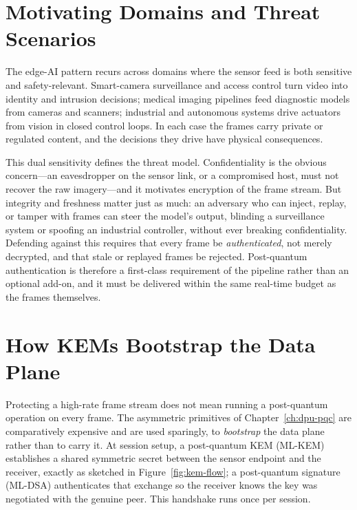 \section{Motivating Domains and Threat Scenarios}
\label{sec:edge-threats}

The edge-AI pattern recurs across domains where the sensor feed is both sensitive and safety-relevant. Smart-camera surveillance and access control turn video into identity and intrusion decisions; medical imaging pipelines feed diagnostic models from cameras and scanners; industrial and autonomous systems drive actuators from vision in closed control loops. In each case the frames carry private or regulated content, and the decisions they drive have physical consequences.

This dual sensitivity defines the threat model. Confidentiality is the obvious concern---an eavesdropper on the sensor link, or a compromised host, must not recover the raw imagery---and it motivates encryption of the frame stream. But integrity and freshness matter just as much: an adversary who can inject, replay, or tamper with frames can steer the model's output, blinding a surveillance system or spoofing an industrial controller, without ever breaking confidentiality. Defending against this requires that every frame be \emph{authenticated}, not merely decrypted, and that stale or replayed frames be rejected. Post-quantum authentication is therefore a first-class requirement of the pipeline rather than an optional add-on, and it must be delivered within the same real-time budget as the frames themselves.

\section{How KEMs Bootstrap the Data Plane}
\label{sec:edge-kem-bootstrap}

Protecting a high-rate frame stream does not mean running a post-quantum operation on every frame. The asymmetric primitives of Chapter~\ref{ch:dpu-pqc} are comparatively expensive and are used sparingly, to \emph{bootstrap} the data plane rather than to carry it. At session setup, a post-quantum KEM (ML-KEM) establishes a shared symmetric secret between the sensor endpoint and the receiver, exactly as sketched in Figure~\ref{fig:kem-flow}; a post-quantum signature (ML-DSA) authenticates that exchange so the receiver knows the key was negotiated with the genuine peer. This handshake runs once per session.

